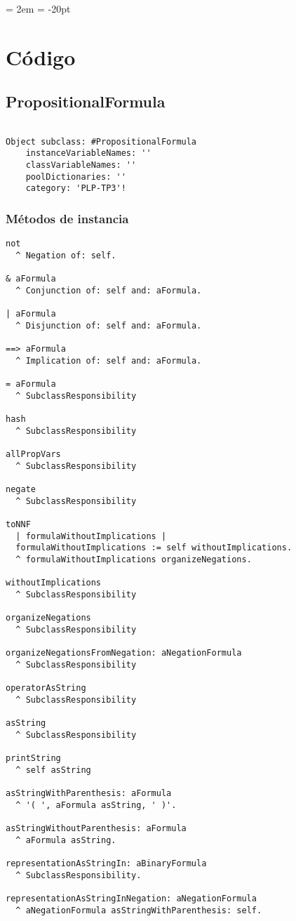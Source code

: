 \documentclass[spanish, 10pt,a4paper]{article}
\numberwithin{equation}{section} %
\begin{document}
{ \oddsidemargin = 2em
	\headheight = -20pt
	\maketitle
}
	\tableofcontents
	\newpage

\section{Código}

\subsection{PropositionalFormula}

\begin{lstlisting}

Object subclass: #PropositionalFormula
	instanceVariableNames: ''
	classVariableNames: ''
	poolDictionaries: ''
	category: 'PLP-TP3'!

\end{lstlisting}

\subsubsection{Métodos de instancia}
\begin{lstlisting}
not 
  ^ Negation of: self.

& aFormula
  ^ Conjunction of: self and: aFormula.

| aFormula
  ^ Disjunction of: self and: aFormula.

==> aFormula
  ^ Implication of: self and: aFormula.

= aFormula 
  ^ SubclassResponsibility

hash 
  ^ SubclassResponsibility

allPropVars
  ^ SubclassResponsibility 

negate
  ^ SubclassResponsibility

toNNF
  | formulaWithoutImplications |
  formulaWithoutImplications := self withoutImplications.
  ^ formulaWithoutImplications organizeNegations.

withoutImplications
  ^ SubclassResponsibility

organizeNegations
  ^ SubclassResponsibility

organizeNegationsFromNegation: aNegationFormula
  ^ SubclassResponsibility

operatorAsString
  ^ SubclassResponsibility

asString
  ^ SubclassResponsibility

printString
  ^ self asString

asStringWithParenthesis: aFormula
  ^ '( ', aFormula asString, ' )'.

asStringWithoutParenthesis: aFormula
  ^ aFormula asString.

representationAsStringIn: aBinaryFormula
  ^ SubclassResponsibility.

representationAsStringInNegation: aNegationFormula
  ^ aNegationFormula asStringWithParenthesis: self.

\end{lstlisting}
\end{document}
